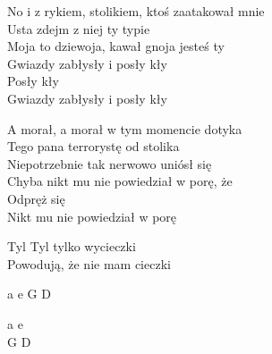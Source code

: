 \documentclass[a5paper, 10pt]{book}
\begin{document}
\begin{minipage}[t]{0.8\textwidth}
No i z rykiem, stolikiem, ktoś zaatakował mnie\\
Usta zdejm z niej ty typie\\
Moja to dziewoja, kawał gnoja jesteś ty\\
Gwiazdy zabłysły i posły kły\\
\hspace*{5mm}Posły kły\\
\hspace*{5mm}Gwiazdy zabłysły i posły kły\vspace*{1.6mm}

A morał, a morał w tym momencie dotyka\\
Tego pana terrorystę od stolika\\
Niepotrzebnie tak nerwowo uniósł się\\
Chyba nikt mu nie powiedział w porę, że\\
\hspace*{5mm}Odpręż się\\
\hspace*{5mm}Nikt mu nie powiedział w porę\vspace*{1.6mm}

\hspace*{3mm}Tyl Tyl tylko wycieczki\\
\hspace*{3mm}Powodują, że nie mam cieczki\\
\end{minipage}
\begin{minipage}[t]{0.2\textwidth}
a e G D\vspace*{2mm}

a e\\
G D\\
\end{minipage}

\newpage
\end{document}
